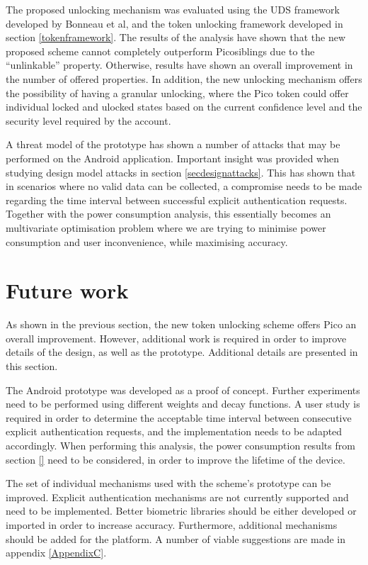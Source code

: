 The proposed unlocking mechanism was evaluated using the UDS framework developed by Bonneau et al, and the token unlocking framework developed in section \ref{tokenframework}. The results of the analysis have shown that the new proposed scheme cannot completely outperform Picosiblings due to the ``unlinkable'' property. Otherwise, results have shown an overall improvement in the number of offered properties. In addition, the new unlocking mechanism offers the possibility of having a granular unlocking, where the Pico token could offer individual locked and ulocked states based on the current confidence level and the security level required by the account.

A threat model of the prototype has shown a number of attacks that may be performed on the Android application. Important insight was provided when studying design model attacks in section \ref{secdesignattacks}. This has shown that in scenarios where no valid data can be collected, a compromise needs to be made regarding the time interval between successful explicit authentication requests. Together with the power consumption analysis, this essentially becomes an multivariate optimisation problem where we are trying to minimise power consumption and user inconvenience, while maximising accuracy.

\section*{Future work}
As shown in the previous section, the new token unlocking scheme offers Pico an overall improvement. However, additional work is required in order to improve details of the design, as well as the prototype. Additional details are presented in this section. 

The Android prototype was developed as a proof of concept. Further experiments need to be performed using different weights and decay functions. A user study is required in order to determine the acceptable time interval between consecutive explicit authentication requests, and the implementation needs to be adapted accordingly. When performing this analysis, the power consumption results from section \ref{} need to be considered, in order to improve the lifetime of the device.


The set of individual mechanisms used with the scheme's prototype can be improved. Explicit authentication mechanisms are not currently supported and need to be implemented. Better biometric libraries should be either developed or imported in order to increase accuracy. Furthermore, additional mechanisms should be added for the platform. A number of viable suggestions are made in appendix \ref{AppendixC}.

